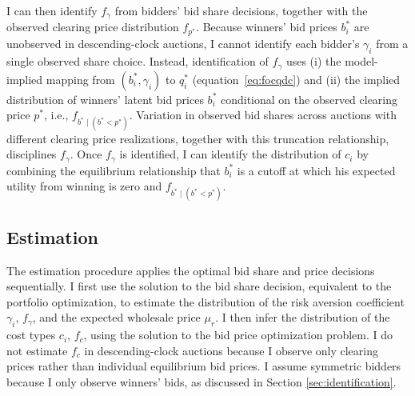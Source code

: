 \documentclass[12pt]{article}
\theoremstyle{definition} %
\begin{document}
I can then identify $f_\gamma$ from bidders' bid share decisions, together with the observed clearing price distribution $f_{p^\ast}$. Because winners' bid prices $b_i^\ast$ are unobserved in descending-clock auctions, I cannot identify each bidder's $\gamma_i$ from a single observed share choice. Instead, identification of $f_\gamma$ uses (i) the model-implied mapping from $(b_i^\ast,\gamma_i)$ to $q_i^\ast$ (equation~\eqref{eq:focqdc}) and (ii) the implied distribution of winners' latent bid prices $b_i^\ast$ conditional on the observed clearing price $p^\ast$, i.e., $f_{b^\ast \mid (b^\ast < p^\ast)}$. Variation in observed bid shares across auctions with different clearing price realizations, together with this truncation relationship, disciplines $f_\gamma$. Once $f_\gamma$ is identified, I can identify the distribution of $c_i$ by combining the equilibrium relationship that $b_i^\ast$ is a cutoff at which his expected utility from winning is zero and $f_{b^\ast \mid (b^\ast < p^\ast)}$.

\subsection{Estimation}
\label{sec:estimation}

The estimation procedure applies the optimal bid share and price decisions sequentially. I first use the solution to the bid share decision, equivalent to the portfolio optimization, to estimate the distribution of the risk aversion coefficient $\gamma_i $, $f_\gamma $, and the expected wholesale price $\mu_r $. I then infer the distribution of the cost types $c_i$, $f_c $, using the solution to the bid price optimization problem. I do not estimate $f_c $ in descending-clock auctions because I observe only  clearing prices rather than individual equilibrium bid prices. I assume symmetric bidders because I only observe winners' bids, as discussed in Section \ref{sec:identification}.
\end{document}
